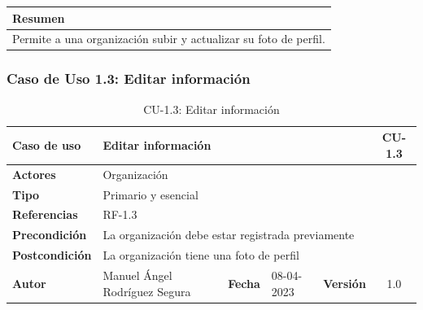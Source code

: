 \begin{table}[H]
    \centering
    \begin{tabularx}{\textwidth}{@{} |L |@{}} \hline
        \textbf{Resumen} \\
        \hline
        Permite a una organización subir y actualizar su foto de perfil. \\
        \hline
    \end{tabularx}
\end{table}

\subsubsection{Caso de Uso 1.3: Editar información}\label{subsubsec:editar-informacion}

\begin{table}[H]
    \begin{center}
        \begin{adjustbox}{width=\textwidth}
            \begin{tabular}{ | l | l | l | l | c | c | }
                \hline
                \textbf{Caso de uso} & \multicolumn{4}{l|}{Editar información} & \cellcolor{gray!50} \textbf{CU-1.3}\\
                \hline
                \textbf{Actores} & \multicolumn{5}{p{0.5\linewidth}|}{Organización} \\
                \hline
                \textbf{Tipo} & \multicolumn{5}{l|}{Primario y esencial} \\
                \hline
                \textbf{Referencias} & \multicolumn{3}{l|}{RF-1.3} & \multicolumn{2}{l|}{ }\\
                \hline
                \textbf{Precondición} & \multicolumn{5}{l|}{La organización debe estar registrada previamente} \\
                \hline
                \textbf{Postcondición} & \multicolumn{5}{l|}{La organización tiene una foto de perfil} \\
                \hline
                \textbf{Autor} & \multicolumn{1}{p{0.25\linewidth}|}{Manuel Ángel Rodríguez Segura} & \textbf{Fecha} &
                08-04-2023     & \textbf{Versión}                                                      & 1.0\\
                \hline
            \end{tabular}
        \end{adjustbox}
        \caption{CU-1.3: Editar información}
        \label{tab:editar-organizacion}
    \end{center}
\end{table}

